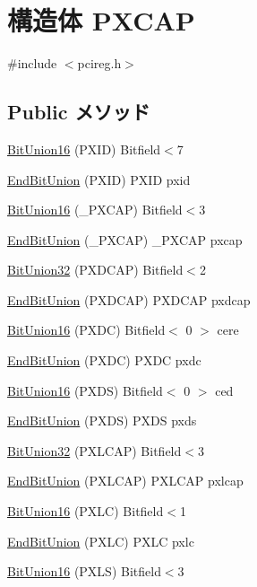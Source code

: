 \hypertarget{structPXCAP}{
\section{構造体 PXCAP}
\label{structPXCAP}
}


{\ttfamily \#include $<$pcireg.h$>$}\subsection*{Public メソッド}
\begin{DoxyCompactItemize}
\item 
\hyperlink{structPXCAP_a54457bb72dd4cc0dcbb4b9e6b9b1fe79}{BitUnion16} (PXID) Bitfield$<$7
\item 
\hyperlink{structPXCAP_a25d7b8b1634e2b1d96a18c490d3149d2}{EndBitUnion} (PXID) PXID pxid
\item 
\hyperlink{structPXCAP_a1af8aae58f1c51753f89bf0e535d4e26}{BitUnion16} (\_\-PXCAP) Bitfield$<$3
\item 
\hyperlink{structPXCAP_a69a16381cb0ec3c9655a72ff851ea567}{EndBitUnion} (\_\-PXCAP) \_\-PXCAP pxcap
\item 
\hyperlink{structPXCAP_ad1a80749d10ea245b459b2cb22effa06}{BitUnion32} (PXDCAP) Bitfield$<$2
\item 
\hyperlink{structPXCAP_ad6737183dd43a0edc9f7c0e49d3c6dc5}{EndBitUnion} (PXDCAP) PXDCAP pxdcap
\item 
\hyperlink{structPXCAP_a81ea925a63ed493f2925de1b08d6210a}{BitUnion16} (PXDC) Bitfield$<$ 0 $>$ cere
\item 
\hyperlink{structPXCAP_a852138407c0fe24adc04a4d4fafa8452}{EndBitUnion} (PXDC) PXDC pxdc
\item 
\hyperlink{structPXCAP_a56e3fb571dced6898a2faceb3ab35a55}{BitUnion16} (PXDS) Bitfield$<$ 0 $>$ ced
\item 
\hyperlink{structPXCAP_a8c51be36460337a21987e49543de4464}{EndBitUnion} (PXDS) PXDS pxds
\item 
\hyperlink{structPXCAP_ab15d7d1021f2b2f3512dc61d83585600}{BitUnion32} (PXLCAP) Bitfield$<$3
\item 
\hyperlink{structPXCAP_ad33dab23e2bcdd1e0b3730c890d0b873}{EndBitUnion} (PXLCAP) PXLCAP pxlcap
\item 
\hyperlink{structPXCAP_acc928ca85aa385937cc6ed75db137698}{BitUnion16} (PXLC) Bitfield$<$1
\item 
\hyperlink{structPXCAP_a12df665eab6a500e562296cca83181ca}{EndBitUnion} (PXLC) PXLC pxlc
\item 
\hyperlink{structPXCAP_a506258ffa4ec7100aaa3f99297d05e8b}{BitUnion16} (PXLS) Bitfield$<$3

\end{DoxyCompactItemize}
